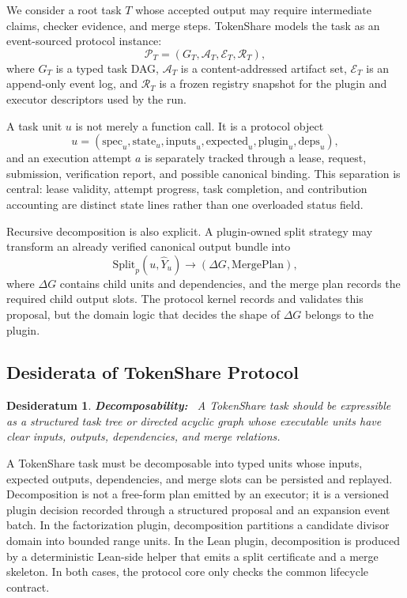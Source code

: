 \documentclass{article}
\theoremstyle{plain}
\newtheorem{desideratum}{Desideratum}
\begin{document}
{\color{blue}
We consider a root task $T$ whose accepted output may require intermediate claims, checker evidence, and merge steps. TokenShare models the task as an event-sourced protocol instance:
\[
\mathcal{P}_T=(G_T,\mathcal{A}_T,\mathcal{E}_T,\mathcal{R}_T),
\]
where $G_T$ is a typed task DAG, $\mathcal{A}_T$ is a content-addressed artifact set, $\mathcal{E}_T$ is an append-only event log, and $\mathcal{R}_T$ is a frozen registry snapshot for the plugin and executor descriptors used by the run.

A task unit $u$ is not merely a function call. It is a protocol object
\[
u=(\mathrm{spec}_u,\mathrm{state}_u,\mathrm{inputs}_u,\mathrm{expected}_u,\mathrm{plugin}_u,\mathrm{deps}_u),
\]
and an execution attempt $a$ is separately tracked through a lease, request, submission, verification report, and possible canonical binding. This separation is central: lease validity, attempt progress, task completion, and contribution accounting are distinct state lines rather than one overloaded status field.

Recursive decomposition is also explicit. A plugin-owned split strategy may transform an already verified canonical output bundle into
\[
\mathrm{Split}_p(u,\hat{Y}_u)\rightarrow(\Delta G, \mathrm{MergePlan}),
\]
where $\Delta G$ contains child units and dependencies, and the merge plan records the required child output slots. The protocol kernel records and validates this proposal, but the domain logic that decides the shape of $\Delta G$ belongs to the plugin.
}



\subsection{Desiderata of TokenShare Protocol}


\begin{desideratum}
\textbf{Decomposability:}~ A TokenShare task should be expressible as a structured task tree or directed acyclic graph whose executable units have clear inputs, outputs, dependencies, and merge relations.
\end{desideratum}

{\color{blue}
A TokenShare task must be decomposable into typed units whose inputs, expected outputs, dependencies, and merge slots can be persisted and replayed. Decomposition is not a free-form plan emitted by an executor; it is a versioned plugin decision recorded through a structured proposal and an expansion event batch. In the factorization plugin, decomposition partitions a candidate divisor domain into bounded range units. In the Lean plugin, decomposition is produced by a deterministic Lean-side helper that emits a split certificate and a merge skeleton. In both cases, the protocol core only checks the common lifecycle contract.
}
\end{document}
